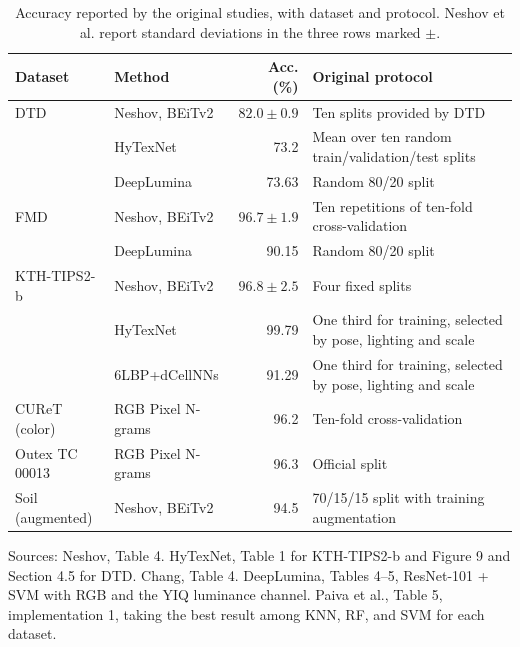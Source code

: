 \documentclass[10pt,a4paper,fleqn]{article}
\begin{document}
\begin{table}[htbp]
\centering
\caption{Accuracy reported by the original studies, with dataset and protocol. Neshov et al. report standard deviations in the three rows marked $\pm$.}
\label{tab:publicados}
\setlength{\tabcolsep}{4pt}
\begin{tabular}{@{}p{}p{}r p{}@{}}
\toprule
Dataset & Method & Acc. (\%) & Original protocol \\
\midrule
DTD & Neshov, BEiTv2 \citep{neshov2025aggregation} & $82.0\pm0.9$ & Ten splits provided by DTD \\
 & HyTexNet \citep{gupta2026hytexnet} & 73.2 & Mean over ten random train/validation/test splits \\
 & DeepLumina \citep{simon2022deeplumina} & 73.63 & Random 80/20 split \\
\addlinespace
FMD & Neshov, BEiTv2 \citep{neshov2025aggregation} & $96.7\pm1.9$ & Ten repetitions of ten-fold cross-validation \\
 & DeepLumina \citep{simon2022deeplumina} & 90.15 & Random 80/20 split \\
\addlinespace
KTH-TIPS2-b & Neshov, BEiTv2 \citep{neshov2025aggregation} & $96.8\pm2.5$ & Four fixed splits \\
 & HyTexNet \citep{gupta2026hytexnet} & 99.79 & One third for training, selected by pose, lighting and scale \\
 & 6LBP+dCellNNs \citep{chang2024cellnn} & 91.29 & One third for training, selected by pose, lighting and scale \\
\addlinespace
CUReT (color) & RGB Pixel N-grams \citep{paiva2023rgb} & 96.2 & Ten-fold cross-validation \\
Outex TC 00013 & RGB Pixel N-grams \citep{paiva2023rgb} & 96.3 & Official split \\
Soil (augmented) & Neshov, BEiTv2 \citep{neshov2025aggregation} & 94.5 & 70/15/15 split with training augmentation \\
\bottomrule
\end{tabular}

\medskip
\begin{minipage}{.97\textwidth}\footnotesize
Sources: Neshov, Table 4. HyTexNet, Table 1 for KTH-TIPS2-b and Figure 9 and Section 4.5 for DTD. Chang, Table 4. DeepLumina, Tables 4--5, ResNet-101 + SVM with RGB and the YIQ luminance channel. Paiva et al., Table 5, implementation 1, taking the best result among KNN, RF, and SVM for each dataset.
\end{minipage}
\end{table}
\FloatBarrier
\end{document}
